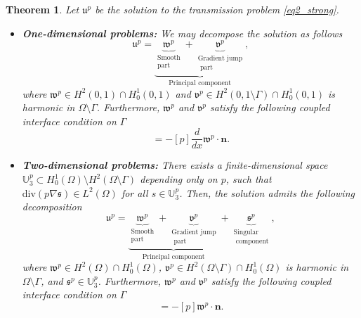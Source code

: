 \documentclass[oneside]{article}
\newtheorem{theorem}{Theorem}[section]
\begin{document}
\begin{theorem}\label{thm_decomposition}
Let $\mathfrak{u}^p$ be the solution to the transmission problem \eqref{eq2_strong}.
\begin{itemize}
    \item \textbf{One-dimensional problems:} We may decompose the solution as follows
\begin{equation}\label{eq2_exact solution_1D}
\mathfrak{u}^p= \underbrace{\underbrace{\mathfrak{w}^p}_{\substack{\text{Smooth}\\ \text{part}}} +  \underbrace{\mathfrak{v}^p}_{\substack{\text{Gradient jump} \\ \text{ part}}} }_{\text{Principal component}},    
\end{equation}
where $\mathfrak{w}^p\in H^2(0,1)\cap H^1_0(0,1)$ and $\mathfrak{v}^p\in H^2(0,1\setminus \Gamma)\cap H^1_0(0,1)$ is harmonic in $\Omega \setminus\Gamma$. Furthermore, $\mathfrak{w}^p$ and $\mathfrak{v}^p$ satisfy the following coupled interface condition on $\Gamma$ 
\begin{equation}
    [p\frac{d}{dx}\mathfrak{v}^p\cdot\mathbf{n}]=-[p]\frac{d}{dx}\mathfrak{w}^p\cdot\mathbf{n}.
\end{equation}
\item \textbf{Two-dimensional problems:} There exists a finite-dimensional space $\mathbb{U}_3^p\subset H^1_0(\Omega)\setminus H^2(\Omega\setminus\Gamma)$ depending only on $p$, such that $\text{div}(p\nabla \mathfrak{s})\in L^2(\Omega)$ for all $s\in \mathbb{U}^p_3$. Then, the solution admits the following decomposition
\begin{equation}\label{eq2_exact solution_2D}
\mathfrak{u}^p= \underbrace{\underbrace{\mathfrak{w}^p}_{\substack{\text{Smooth}\\ \text{part}}} +  \underbrace{\mathfrak{v}^p}_{\substack{\text{Gradient jump} \\ \text{ part}}} }_{\text{Principal component}}+ \underbrace{\mathfrak{s}^p}_{\substack{\text{Singular}\\ \text{ component}}},    
\end{equation}
where $\mathfrak{w}^p\in H^2(\Omega)\cap H^1_0(\Omega)$, $\mathfrak{v}^p\in H^2(\Omega\setminus \Gamma)\cap H^1_0(\Omega)$ is harmonic in $\Omega \setminus\Gamma$, and $\mathfrak{s}^p\in\mathbb{U}^p_3$. Furthermore, $\mathfrak{w}^p$ and $\mathfrak{v}^p$ satisfy the following coupled interface condition on $\Gamma$
\begin{equation}
   [p\nabla \mathfrak{v}^p\cdot \mathbf{n}]=-[p]\mathfrak{w}^p\cdot \mathbf{n}. 
\end{equation}
\end{itemize}

\end{theorem}
\end{document}
